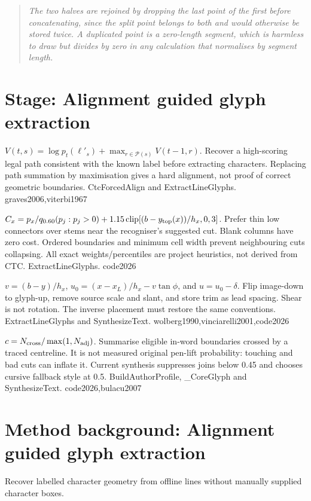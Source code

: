 \begin{quote}\small\itshape The two halves are rejoined by dropping the last point of the first before concatenating, since the split point belongs to both and would otherwise be stored twice. A duplicated point is a zero-length segment, which is harmless to draw but divides by zero in any calculation that normalises by segment length.\end{quote}


\section*{Stage: Alignment guided glyph extraction}
{$V(t,s)=\log p_t(\ell'_s)+\max_{r\in\mathcal P(s)}V(t-1,r)$.}
{Recover a high-scoring legal path consistent with the known label before
extracting characters. Replacing path summation by maximisation gives a hard
alignment, not proof of correct geometric boundaries.}
{CtcForcedAlign and ExtractLineGlyphs.}
{graves2006,viterbi1967}

{$C_x=p_x/q_{0.60}(p_j:p_j>0)+1.15\,\mathrm{clip}[(b-y_{\rm top}(x))/h_x,0,3]$.}
{Prefer thin low connectors over stems near the recogniser's suggested cut.
Blank columns have zero cost. Ordered boundaries and minimum cell width
prevent neighbouring cuts collapsing. All exact weights/percentiles are
project heuristics, not derived from CTC.}
{ExtractLineGlyphs.}
{code2026}

{$v=(b-y)/h_x$, $u_0=(x-x_L)/h_x-v\tan\phi$, and $u=u_0-\delta$.}
{Flip image-down to glyph-up, remove source scale and slant, and store trim
as lead spacing. Shear is not rotation. The inverse placement must restore
the same conventions.}
{ExtractLineGlyphs and SynthesizeText.}
{wolberg1990,vinciarelli2001,code2026}

{$c=N_{\rm cross}/\max(1,N_{\rm adj})$.}
{Summarise eligible in-word boundaries crossed by a traced centreline. It is
not measured original pen-lift probability: touching and bad cuts can inflate
it. Current synthesis suppresses joins below 0.45 and chooses cursive fallback
style at 0.5.}
{BuildAuthorProfile, \_CoreGlyph and SynthesizeText.}
{code2026,bulacu2007}


\section{Method background: Alignment guided glyph extraction}\label{method:glyph}
Recover labelled character geometry from offline lines without manually supplied character boxes.


